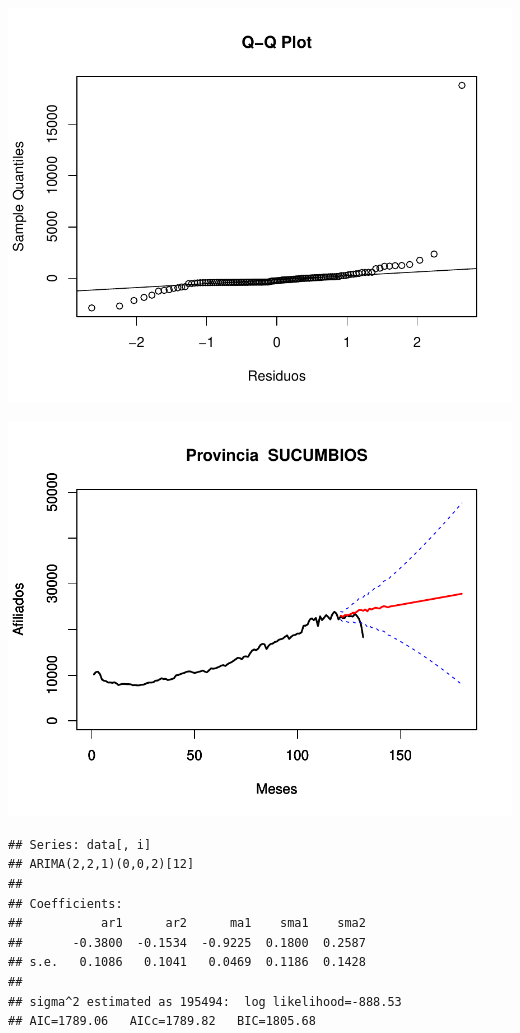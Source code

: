 \documentclass[11pt,a4paper,oneside]{article}\usepackage[]{graphicx}\usepackage[]{color}
\makeatletter
\def\maxwidth{ %
  \ifdim\Gin@nat@width>\linewidth
    \linewidth
  \else
    \Gin@nat@width
  \fi
}
\newenvironment{kframe}{%
 \def\at@end@of@kframe{}%
 \ifinner\ifhmode%
  \def\at@end@of@kframe{\end{minipage}}%
  \begin{minipage}{\columnwidth}%
 \fi\fi%
 \def\FrameCommand##1{\hskip\@totalleftmargin \hskip-\fboxsep
 \colorbox{shadecolor}{##1}\hskip-\fboxsep
     \hskip-\linewidth \hskip-\@totalleftmargin \hskip\columnwidth}%
 \MakeFramed {\advance\hsize-\width
   \@totalleftmargin\z@ \linewidth\hsize
   \@setminipage}}%
 {\par\unskip\endMakeFramed%
 \at@end@of@kframe}
\newenvironment{knitrout}{}{} %
\makeatother
\begin{document}
\begin{knitrout}
{}




{\centering \includegraphics[width=\maxwidth]{figure/unnamed-chunk-16-63} 

}




{\centering \includegraphics[width=\maxwidth]{figure/unnamed-chunk-16-64} 

}


\begin{kframe}\begin{verbatim}
## Series: data[, i] 
## ARIMA(2,2,1)(0,0,2)[12]                    
## 
## Coefficients:
##           ar1      ar2      ma1    sma1    sma2
##       -0.3800  -0.1534  -0.9225  0.1800  0.2587
## s.e.   0.1086   0.1041   0.0469  0.1186  0.1428
## 
## sigma^2 estimated as 195494:  log likelihood=-888.53
## AIC=1789.06   AICc=1789.82   BIC=1805.68
\end{verbatim}
\end{kframe}


\end{knitrout}
\end{document}
